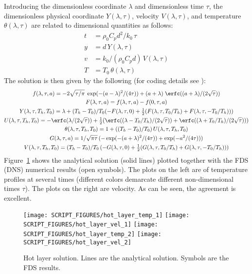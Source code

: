 \documentclass[11pt]{book}
\begin{document}
Introducing the dimensionless coordinate $\lambda$ and dimensionless time $\tau$, the dimensionless physical coordinate $Y(\lambda,\tau)$, velocity $V(\lambda,\tau)$, and temperature $\theta(\lambda,\tau)$ are related to dimensional quantities as follows:
\begin{align}
t &= \rho_0 C_p d^2/k_0 \, \tau  \\
y &= d \, Y(\lambda,\tau) \\
v &= k_0/(\rho_0 C_p d) \, V(\lambda,\tau) \\
T &= T_0 \, \theta(\lambda,\tau)
\end{align}
The solution is then given by the following (for coding details see ):
\begin{gather}
f(\lambda,\tau,a) = -2\sqrt{\tau/\pi}\;\exp(-(a-\lambda)^2/(4\tau)) + (a+\lambda)\;\erfc((a+\lambda)/(2\sqrt{\tau})) \\
F(\lambda,\tau,a) = f(\lambda,\tau,a) - f(0,\tau,a) \\
Y(\lambda,\tau,T_h,T_0) = \lambda + (T_h-T_0)/T_0( -F(\lambda,\tau,0) + \mbox{$\frac{1}{2}$}( F(\lambda,\tau,T_0/T_h) + F(\lambda,\tau,-T_0/T_h) ) ) \\
U(\lambda,\tau,T_h,T_0) = -\erfc(\lambda/(2\sqrt{\tau})) + \mbox{$\frac{1}{2}$}( \erfc( (\lambda - T_0/T_h)/(2\sqrt{\tau}) ) + \erfc( (\lambda + T_0/T_h)/(2\sqrt{\tau}) ) ) \\
\theta(\lambda,\tau,T_h,T_0) = 1 + ( (T_h - T_0)/T_0 ) \, U(\lambda,\tau,T_h,T_0) \\
G(\lambda,\tau,a) = 1/\sqrt{\pi\tau} \, ( -\exp(-(a+\lambda)^2/(4\tau)) + \exp(-a^2/(4\tau)) ) \\
V(\lambda,\tau,T_h,T_0) = (T_h-T_0)/T_0 \, ( -G(\lambda,\tau,0) + \mbox{$\frac{1}{2}$}(G(\lambda,\tau,T_0/T_h) + G(\lambda,\tau,-T_0/T_h)) )
\end{gather}
Figure~\ref{fig_hot_layer} shows the analytical solution (solid lines) plotted together with the FDS (DNS) numerical results (open symbols).  The plots on the left are of temperature profiles at several times (different colors demarcate different non-dimensional times $\tau$).  The plots on the right are velocity.  As can be seen, the agreement is excellent.

\begin{figure}[ht]
\centering
\texttt{[image: SCRIPT\_FIGURES/hot\_layer\_temp\_1]}
\texttt{[image: SCRIPT\_FIGURES/hot\_layer\_vel\_1]}
\texttt{[image: SCRIPT\_FIGURES/hot\_layer\_temp\_2]}
\texttt{[image: SCRIPT\_FIGURES/hot\_layer\_vel\_2]}
\caption[The  test case]{Hot layer solution. Lines are the analytical solution.  Symbols are the FDS results.}
\label{fig_hot_layer}
\end{figure}
\end{document}
